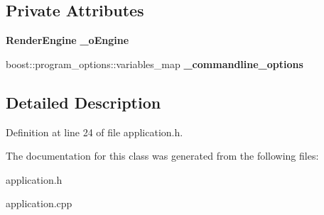 \subsection*{Private Attributes}
\begin{DoxyCompactItemize}
\item 
{\bf Render\-Engine} {\bfseries \-\_\-o\-Engine}\label{classsfs__visualizer_1_1Application_aa97d6334e9169ab95984985e776cfbf1}

\item 
boost\-::program\-\_\-options\-::variables\-\_\-map {\bfseries \-\_\-commandline\-\_\-options}\label{classsfs__visualizer_1_1Application_a11a3f14eead7f89a6ec266571f90d0cc}

\end{DoxyCompactItemize}


\subsection{Detailed Description}


Definition at line 24 of file application.\-h.



The documentation for this class was generated from the following files\-:\begin{DoxyCompactItemize}
\item 
application.\-h\item 
application.\-cpp\end{DoxyCompactItemize}
